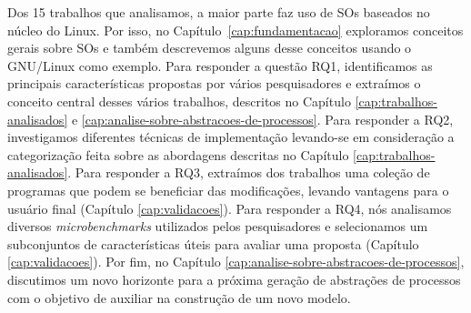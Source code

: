 Dos 15 trabalhos que analisamos, a maior parte faz uso de SOs baseados no
núcleo do Linux. Por isso, no Capítulo~\ref{cap:fundamentacao} exploramos
conceitos gerais sobre SOs e também descrevemos alguns desse conceitos usando o
GNU/Linux como exemplo. Para responder a questão RQ1, identificamos as
principais características propostas por vários pesquisadores e extraímos o
conceito central desses vários trabalhos, descritos no Capítulo
\ref{cap:trabalhos-analisados} e
\ref{cap:analise-sobre-abstracoes-de-processos}. Para responder a RQ2,
investigamos diferentes técnicas de implementação levando-se em consideração a
categorização feita sobre as abordagens descritas no Capítulo
\ref{cap:trabalhos-analisados}. Para responder a RQ3, extraímos dos trabalhos
uma coleção de programas que podem se beneficiar das modificações, levando
vantagens para o usuário final (Capítulo \ref{cap:validacoes}). Para responder
a RQ4, nós analisamos diversos \emph{microbenchmarks} utilizados pelos
pesquisadores e selecionamos um subconjuntos de características úteis para
avaliar uma proposta (Capítulo \ref{cap:validacoes}). Por fim, no Capítulo
\ref{cap:analise-sobre-abstracoes-de-processos}, discutimos um novo horizonte
para a próxima geração de abstrações de processos com o objetivo de auxiliar na
construção de um novo modelo.
